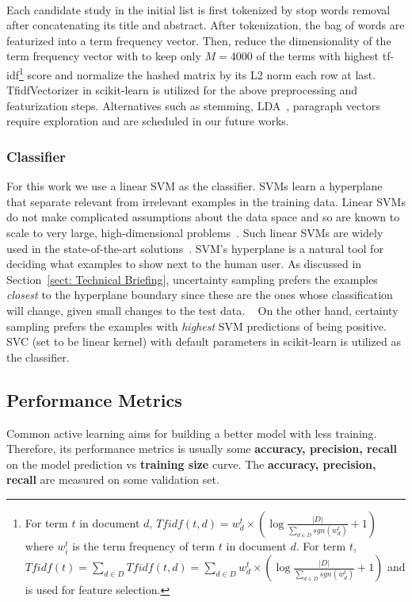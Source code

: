 \documentclass{svjour3}
\theoremstyle{break}
\newcommand{\respto}[1]{
\fcolorbox{black}{black!15}{
\label{response:#1}
\bf
  \scriptsize R-{#1}}~
}
\begin{document}
\respto{1g1}
Each candidate study in the initial list is first tokenized by stop words removal after concatenating its title and abstract. After tokenization, the bag of words are featurized into a term frequency vector. Then, reduce the dimensionality of the term frequency vector with to keep only $M=4000$ of the terms with highest tf-idf\footnote{For term $t$ in document $d$, $Tfidf(t, d)=w^t_d\times (\log \frac{|D|}{\sum_{d\in D} sgn(w^t_d)}+1)$ where $w^t_i$ is the term frequency of term $t$ in document $d$. For term $t$, $Tfidf(t) = \sum_{d\in D} Tfidf(t,d) = \sum_{d\in D} w^t_d \times (\log \frac{|D|}{\sum_{d\in D} sgn(w^t_d)}+1)$ and is used for feature selection.} score and normalize the hashed matrix by its L2 norm each row at last. TfidfVectorizer in scikit-learn is utilized for the above preprocessing and featurization steps. Alternatives such as stemming, LDA~\cite{blei2003latent}, paragraph vectors~\cite{le2014distributed} require exploration and are scheduled in our future works. 


\subsubsection{Classifier}

For this work we use a linear SVM as the classifier.
SVMs learn a hyperplane that separate relevant from irrelevant examples
in the training data. Linear SVMs do not make complicated assumptions about the data space and so are known to scale to very large, high-dimensional problems~\cite{joachims2006training}. Such linear SVMs are widely used in the state-of-the-art solutions~\cite{miwa2014reducing,cormack2015autonomy,wallace2010semi}. SVM's hyperplane is a natural tool for deciding what examples to show next to the human user. As discussed in Section~\ref{sect: Technical Briefing}, uncertainty sampling prefers the examples {\em closest} to the hyperplane boundary since these are the ones whose classification will
change, given small changes to the test data. \respto{1g2} On the other hand, certainty sampling prefers the examples with {\em highest} SVM predictions of being positive. SVC (set to be linear kernel) with default parameters in scikit-learn is utilized as the classifier.


\subsection{Performance Metrics}
\label{subsect: Performance Metrics}

Common active learning aims for building a better model with less training. Therefore, its performance metrics is usually some \textbf{accuracy, precision, recall} on the model prediction vs \textbf{training size} curve. The \textbf{accuracy, precision, recall} are measured on some validation set.
\end{document}
